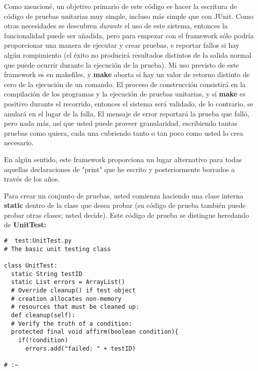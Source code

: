 Como mencioné, un objetivo primario de este código es hacer la escritura de código de pruebas unitarias muy simple, incluso más simple que con JUnit. Como otras necesidades se descubren \textit{durante} el uso de este sistema, entonces la funcionalidad puede ser añadida, pero para empezar con el framework sólo podría proporcionar una manera de ejecutar y crear pruebas, e reportar fallos si hay algún rompimiento (el éxito no producirá resultados distintos de la salida normal que puede ocurrir durante la ejecución de la prueba). Mi uso previsto de este framework es en makefiles, y \textbf{make} aborta si hay un valor de retorno distinto de cero de la ejecución de un comando. El proceso de construcción consistirá en la compilación de los programas y la ejecución de pruebas unitarias, y si \textbf{make} es positivo durante el recorrido, entonces el sistema será validado, de lo contrario, se anulará en el lugar de la falla, El mensaje de error reportará la prueba que falló, pero nada más, así que usted puede proveer granularidad, escribiendo tantas pruebas como quiera, cada una cubriendo tanto o tan poco como usted lo crea necesario.     \newline

En algún sentido, este framework proporciona un lugar alternativo para todas aquellas declaraciones de "print" que he escrito y posteriormente borrados a través de los años.     \newline

Para crear un conjunto de pruebas, usted comienza haciendo una clase interna \textbf{static} dentro de la clase que desea probar (su código de prueba también puede probar otras clases; usted decide). Este código de prueba se distingue heredando de \textbf{UnitTest:}   \newline

 \begin{lstlisting}
#  test:UnitTest.py 
# The basic unit testing class 

class UnitTest:  
  static String testID 
  static List errors = ArrayList() 
  # Override cleanup() if test object  
  # creation allocates non-memory  
  # resources that must be cleaned up: 
  def cleanup(self): 
  # Verify the truth of a condition: 
  protected final void affirm(boolean condition){ 
    if(!condition) 
      errors.add("failed: " + testID) 
      
# :~ 
\end{lstlisting}

